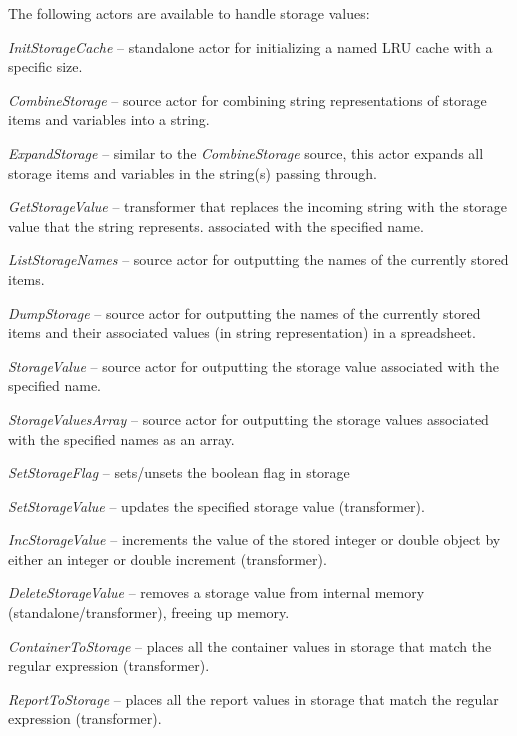 The following actors are available to handle storage values:
\begin{tight_itemize}
	\item \textit{InitStorageCache} -- standalone actor for initializing a named
	LRU cache with a specific size.
	\item \textit{CombineStorage} -- source actor for combining string 
	representations of storage items and variables into a string.
	\item \textit{ExpandStorage} -- similar to the \textit{CombineStorage}
	source, this actor expands all storage items and variables in the string(s) 
	passing through.
	\item \textit{GetStorageValue} -- transformer that replaces the incoming 
	string with the storage value that the string represents.
	associated with the specified name.
	\item \textit{ListStorageNames} -- source actor for outputting the names of 
	the currently stored items.
	\item \textit{DumpStorage} -- source actor for outputting the names of
	the currently stored items and their associated values (in string
	representation) in a spreadsheet.
	\item \textit{StorageValue} -- source actor for outputting the storage value
	associated with the specified name.
	\item \textit{StorageValuesArray} -- source actor for outputting the 
	storage values associated with the specified names as an array.
	\item \textit{SetStorageFlag} -- sets/unsets the boolean flag in storage
	\item \textit{SetStorageValue} -- updates the specified storage value
	(transformer).
	\item \textit{IncStorageValue} -- increments the value of the stored integer or
	double object by either an integer or double increment (transformer).
	\item \textit{DeleteStorageValue} -- removes a storage value
	from internal memory (standalone/transformer), freeing up memory.
	\item \textit{ContainerToStorage} -- places all the container values in storage
	that match the regular expression (transformer).
	\item \textit{ReportToStorage} -- places all the report values in storage
	that match the regular expression (transformer).
\end{tight_itemize}


